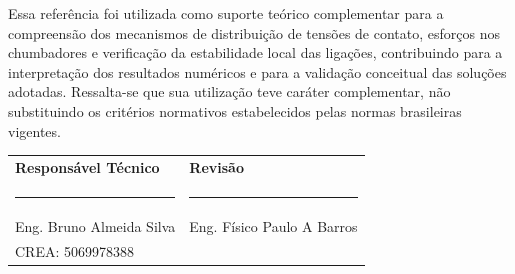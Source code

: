 \documentclass[12pt, a4paper]{article}
\begin{document}
Essa referência foi utilizada como suporte teórico complementar para a compreensão dos mecanismos de distribuição de tensões de contato, esforços nos chumbadores e verificação da estabilidade local das ligações, contribuindo para a interpretação dos resultados numéricos e para a validação conceitual das soluções adotadas. Ressalta-se que sua utilização teve caráter complementar, não substituindo os critérios normativos estabelecidos pelas normas brasileiras vigentes.

\postextual
\newpage
\thispagestyle{empty} %

\vspace*{5cm} %

\begin{tabular}{@{} m{8cm}<{\centering} m{7cm}<{\centering} @{}}
\textbf{Responsável Técnico} & \textbf{Revisão} \\[5em]
\rule{7cm}{0.4pt} & \rule{7cm}{0.4pt} \\[0.5em]
Eng. Bruno Almeida Silva & Eng. Físico Paulo A Barros \\
CREA: 5069978388 & \\
\end{tabular}
\end{document}
